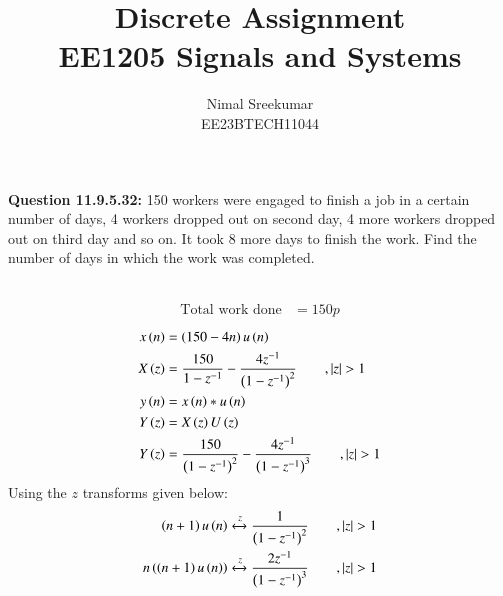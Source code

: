 \documentclass[a4,12pt,twocolumn]{IEEEtran}
\begin{document}
\let\vec\mathbf

\title{
\Huge\textbf{Discrete Assignment}\\
\Huge\textbf{EE1205} Signals and Systems\\
}
\large\author{Nimal Sreekumar\\EE23BTECH11044}

\maketitle



\bigskip

\renewcommand{\thefigure}{\arabic{figure}}
\renewcommand{\thetable}{\theenumi}


\textbf{Question 11.9.5.32:}
150 workers were engaged to finish a job in a certain number of days, 4 workers dropped out on second day, 4 more workers dropped out on third day and so on. It took 8 more days to finish the work. Find the number of days in which the work was completed.\\

\solution\\
\fi

\begin{align}
\text{Total work done} &= 150p\label{eq:11.9.5.32.1}
\end{align}
\begin{align}
x\brak{n} &= \brak{150-4n}u\brak{n}\label{eq:11.9.5.32.2}\\
X\brak{z} &= \frac{150}{1-z^{-1}}- \frac{4z^{-1}}{\brak{1-z^{-1}}^2} \qquad ,|z| > 1 \label{eq:11.9.5.32.3}\\
y\brak{n} &= x\brak{n}*u\brak{n}\label{eq:11.9.5.32.4}\\
Y\brak{z} &= X\brak{z}U\brak{z}\label{eq:11.9.5.32.5}\\
Y\brak{z} &=\frac{150}{\brak{1-z^{-1}}^2}- \frac{4z^{-1}}{\brak{1-z^{-1}}^3} \qquad ,|z| > 1\label{eq:11.9.5.32.6}
\end{align}
Using the $z$ transforms given below:
\begin{align}
\brak{n+1}u\brak{n} \xleftrightarrow{z} \frac{1}{\brak{1-z^{-1}}^2} \qquad ,|z| > 1 \label{eq:11.9.5.32.7}\\
n\brak{\brak{n+1}u\brak{n}}\xleftrightarrow{z} \frac{2z^{-1}}{\brak{1-z^{-1}}^3} \qquad ,|z| > 1 \label{eq:11.9.5.32.8}
\end{align}
\end{document}
